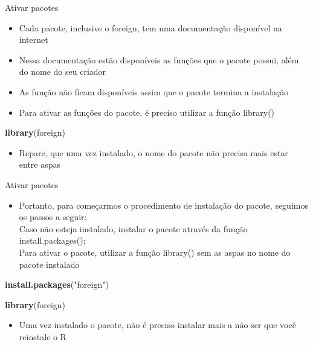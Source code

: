 \documentclass[
  10pt,
  ignorenonframetext,
]{beamer}
\newenvironment{Shaded}{\begin{snugshade}}{\end{snugshade}}
\newcommand{\KeywordTok}[1]{\textcolor[rgb]{0.13,0.29,0.53}{\textbf{#1}}}
\newcommand{\NormalTok}[1]{#1}
\newcommand{\StringTok}[1]{\textcolor[rgb]{0.31,0.60,0.02}{#1}}
\providecommand{\tightlist}{%
  \setlength{\itemsep}{0pt}\setlength{\parskip}{0pt}}
\begin{document}
\begin{frame}[fragile]{Ativar pacotes}
\protect\hypertarget{ativar-pacotes}{}
\begin{itemize}
\tightlist
\item
  Cada pacote, inclusive o foreign, tem uma documentação disponível na
  internet
\item
  Nessa documentação estão disponíveis as funções que o pacote possui,
  além do nome do seu criador
\item
  As função não ficam disponíveis assim que o pacote termina a
  instalação
\item
  Para ativar as funções do pacote, é preciso utilizar a função
  library()
\end{itemize}

\begin{Shaded}
\begin{Highlighting}[]
\KeywordTok{library}\NormalTok{(foreign)}
\end{Highlighting}
\end{Shaded}

\begin{itemize}
\tightlist
\item
  Repare, que uma vez instalado, o nome do pacote não precisa mais estar
  entre aspas
\end{itemize}
\end{frame}

\begin{frame}[fragile]{Ativar pacotes}
\protect\hypertarget{ativar-pacotes-1}{}
\begin{itemize}
\tightlist
\item
  Portanto, para começarmos o procedimento de instalação do pacote,
  seguimos os passos a seguir:\\
  Caso não esteja instalado, instalar o pacote através da função
  install.packages();\\
  Para ativar o pacote, utilizar a função library() sem as aspas no nome
  do pacote instalado
\end{itemize}

\begin{Shaded}
\begin{Highlighting}[]
\KeywordTok{install.packages}\NormalTok{(}\StringTok{"foreign"}\NormalTok{)}

\KeywordTok{library}\NormalTok{(foreign)}
\end{Highlighting}
\end{Shaded}

\begin{itemize}
\tightlist
\item
  Uma vez instalado o pacote, não é preciso instalar mais a não ser que
  você reinstale o R
\end{itemize}
\end{frame}
\end{document}
